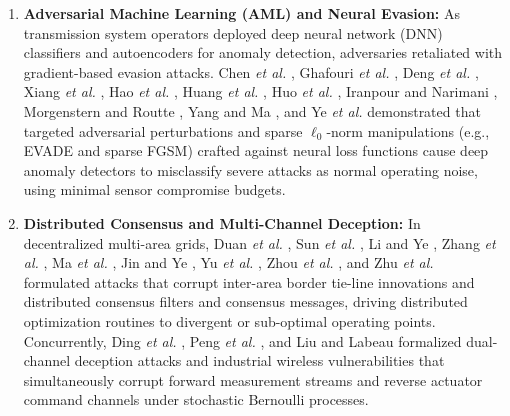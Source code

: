 \documentclass[journal,compsoc]{IEEEtran}
\begin{document}
\begin{enumerate}
    \item \textbf{Adversarial Machine Learning (AML) and Neural Evasion:} As transmission system operators deployed deep neural network (DNN) classifiers and autoencoders for anomaly detection, adversaries retaliated with gradient-based evasion attacks. Chen \textit{et al.} \cite{ref35}, Ghafouri \textit{et al.} \cite{ref15}, Deng \textit{et al.} \cite{ref14}, Xiang \textit{et al.} \cite{ref36}, Hao \textit{et al.} \cite{ref44}, Huang \textit{et al.} \cite{ref45}, Huo \textit{et al.} \cite{ref46}, Iranpour and Narimani \cite{ref47}, Morgenstern and Routte \cite{ref50, ref51}, Yang and Ma \cite{ref55}, and Ye \textit{et al.} \cite{ref64} demonstrated that targeted adversarial perturbations and sparse $\ell_0$-norm manipulations (e.g., EVADE and sparse FGSM) crafted against neural loss functions cause deep anomaly detectors to misclassify severe attacks as normal operating noise, using minimal sensor compromise budgets.
    \item \textbf{Distributed Consensus and Multi-Channel Deception:} In decentralized multi-area grids, Duan \textit{et al.} \cite{ref52}, Sun \textit{et al.} \cite{ref53}, Li and Ye \cite{ref28}, Zhang \textit{et al.} \cite{ref57}, Ma \textit{et al.} \cite{ref58}, Jin and Ye \cite{ref67}, Yu \textit{et al.} \cite{ref71}, Zhou \textit{et al.} \cite{ref73}, and Zhu \textit{et al.} \cite{ref74} formulated attacks that corrupt inter-area border tie-line innovations and distributed consensus filters and consensus messages, driving distributed optimization routines to divergent or sub-optimal operating points. Concurrently, Ding \textit{et al.} \cite{ref16}, Peng \textit{et al.} \cite{ref17}, and Liu and Labeau \cite{ref60} formalized dual-channel deception attacks and industrial wireless vulnerabilities that simultaneously corrupt forward measurement streams and reverse actuator command channels under stochastic Bernoulli processes.
\end{enumerate}
\end{document}
